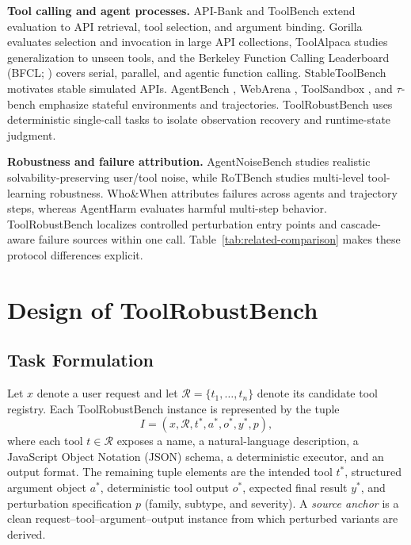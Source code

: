 \documentclass[11pt]{article}
\newcommand{\ToolRobustBench}{ToolRobustBench\xspace}
\begin{document}
\noindent\textbf{Tool calling and agent processes.}
API-Bank \citep{li2023apibank} and ToolBench \citep{qin2024toolllm} extend evaluation to API retrieval, tool selection, and argument binding. Gorilla \citep{patil2024gorilla} evaluates selection and invocation in large API collections, ToolAlpaca \citep{tang2023toolalpaca} studies generalization to unseen tools, and the Berkeley Function Calling Leaderboard (BFCL; \citealp{patil2025bfcl}) covers serial, parallel, and agentic function calling. StableToolBench \citep{guo2024stabletoolbench} motivates stable simulated APIs. AgentBench \citep{liu2024agentbench}, WebArena \citep{zhou2024webarena}, ToolSandbox \citep{lu2025toolsandbox}, and $\tau$-bench \citep{yao2025taubench} emphasize stateful environments and trajectories. \ToolRobustBench{} uses deterministic single-call tasks to isolate observation recovery and runtime-state judgment.

\noindent\textbf{Robustness and failure attribution.}
AgentNoiseBench \citep{wang2026agentnoisebench} studies realistic solvability-preserving user/tool noise, while RoTBench \citep{ye2024rotbench} studies multi-level tool-learning robustness. Who\&When \citep{zhang2025whowhen} attributes failures across agents and trajectory steps, whereas AgentHarm \citep{andriushchenko2025agentharm} evaluates harmful multi-step behavior. \ToolRobustBench{} localizes controlled perturbation entry points and cascade-aware failure sources within one call. Table~\ref{tab:related-comparison} makes these protocol differences explicit.

\section{Design of \ToolRobustBench}

\subsection{Task Formulation}
\label{sec:task-formulation}

Let $x$ denote a user request and let $\mathcal{R}=\{t_1,\ldots,t_n\}$ denote its candidate tool registry. Each \ToolRobustBench{} instance is represented by the tuple
\begin{equation}
I=(x,\mathcal{R},t^*,a^*,o^*,y^*,p),
\end{equation}
where each tool $t\in\mathcal{R}$ exposes a name, a natural-language description, a JavaScript Object Notation (JSON) schema, a deterministic executor, and an output format. The remaining tuple elements are the intended tool $t^*$, structured argument object $a^*$, deterministic tool output $o^*$, expected final result $y^*$, and perturbation specification $p$ (family, subtype, and severity). A \emph{source anchor} is a clean request--tool--argument--output instance from which perturbed variants are derived.
\end{document}
